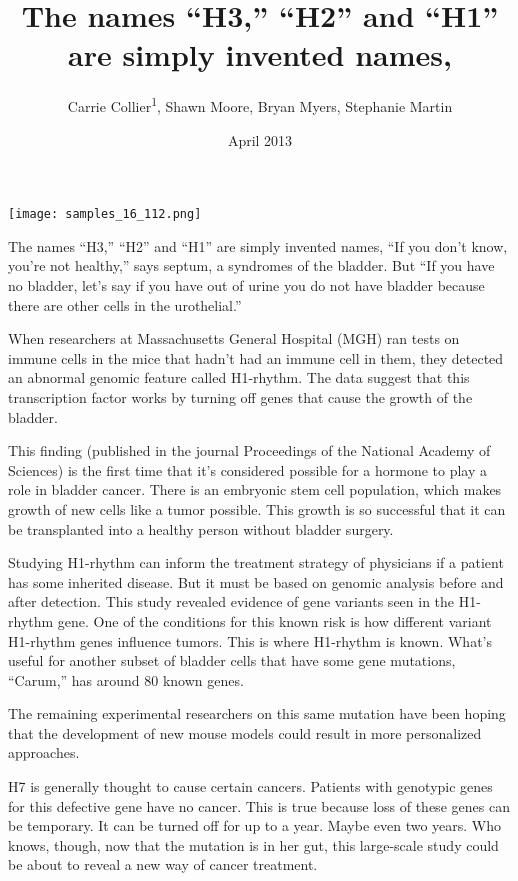 \documentclass{article}
\title{The names “H3,” “H2” and “H1” are simply invented names,}
\author{Carrie Collier\textsuperscript{1},  Shawn Moore,  Bryan Myers,  Stephanie Martin}
\affil{\textsuperscript{1}Kyung Hee University}
\date{April 2013}
\begin{document}
\maketitle

\begin{center}
\begin{minipage}{0.75\linewidth}
\texttt{[image: samples\_16\_112.png]}
\end{minipage}
\end{center}

The names “H3,” “H2” and “H1” are simply invented names, “If you don’t know, you’re not healthy,” says septum, a syndromes of the bladder. But “If you have no bladder, let’s say if you have out of urine you do not have bladder because there are other cells in the urothelial.”

When researchers at Massachusetts General Hospital (MGH) ran tests on immune cells in the mice that hadn’t had an immune cell in them, they detected an abnormal genomic feature called H1-rhythm. The data suggest that this transcription factor works by turning off genes that cause the growth of the bladder.

This finding (published in the journal Proceedings of the National Academy of Sciences) is the first time that it’s considered possible for a hormone to play a role in bladder cancer. There is an embryonic stem cell population, which makes growth of new cells like a tumor possible. This growth is so successful that it can be transplanted into a healthy person without bladder surgery.

Studying H1-rhythm can inform the treatment strategy of physicians if a patient has some inherited disease. But it must be based on genomic analysis before and after detection. This study revealed evidence of gene variants seen in the H1-rhythm gene. One of the conditions for this known risk is how different variant H1-rhythm genes influence tumors. This is where H1-rhythm is known. What’s useful for another subset of bladder cells that have some gene mutations, “Carum,” has around 80 known genes.

The remaining experimental researchers on this same mutation have been hoping that the development of new mouse models could result in more personalized approaches.

H7 is generally thought to cause certain cancers. Patients with genotypic genes for this defective gene have no cancer. This is true because loss of these genes can be temporary. It can be turned off for up to a year. Maybe even two years. Who knows, though, now that the mutation is in her gut, this large-scale study could be about to reveal a new way of cancer treatment.
\end{document}
